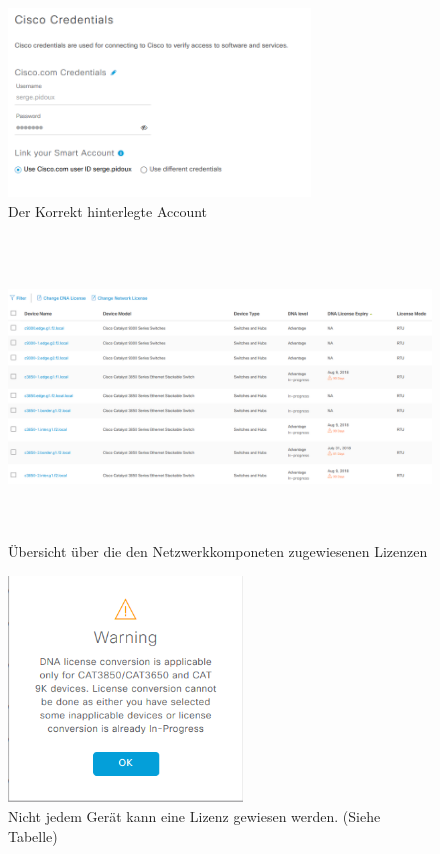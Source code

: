 \begin{figure}[H]
	\centering
	\includegraphics[height=5cm]{img/LicenceManager_002.png}
	\caption{Der Korrekt hinterlegte Account}
	\label{fig:dna-center-licence-5}
\end{figure}

\begin{figure}[H]
	\centering
	\includegraphics[height=8cm]{img/LicenceManager_003.png}
	\caption{Übersicht über die den Netzwerkkomponeten zugewiesenen Lizenzen}
	\label{fig:dna-center-licence-6}
\end{figure}

\begin{figure}[H]
	\centering
	\includegraphics[height=6cm]{img/LicenceManager_004.png}
	\caption{Nicht jedem Gerät kann eine Lizenz gewiesen werden. (Siehe Tabelle)}
	\label{fig:dna-center-licence-7}
\end{figure}

